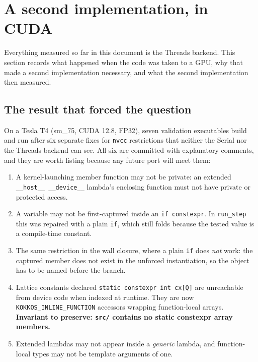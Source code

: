 \documentclass[11pt,a4paper]{article}
\newcommand{\code}[1]{\texttt{\small #1}}
\begin{document}
\section{A second implementation, in CUDA}
\label{sec:cuda}

Everything measured so far in this document is the Threads backend. This section
records what happened when the code was taken to a GPU, why that made a second
implementation necessary, and what the second implementation then measured.

\subsection{The result that forced the question}
\label{sec:cmcollapse}

On a Tesla T4 (sm\_75, CUDA 12.8, FP32), seven validation executables build and
run after six separate fixes for \code{nvcc} restrictions that neither the Serial
nor the Threads backend can see. All six are committed with explanatory comments,
and they are worth listing because any future port will meet them:

\begin{enumerate}[leftmargin=1.4em,itemsep=2pt]
\item A kernel-launching member function may not be private: an extended
  \code{\_\_host\_\_ \_\_device\_\_} lambda's enclosing function must not have
  private or protected access.
\item A variable may not be first-captured inside an \code{if constexpr}. In
  \code{run\_step} this was repaired with a plain \code{if}, which still folds
  because the tested value is a compile-time constant.
\item The same restriction in the wall closure, where a plain \code{if} does
  \emph{not} work: the captured member does not exist in the unforced
  instantiation, so the object has to be named before the branch.
\item Lattice constants declared \code{static constexpr int cx[Q]} are
  unreachable from device code when indexed at runtime. They are now
  \code{KOKKOS\_INLINE\_FUNCTION} accessors wrapping function-local arrays.
  \textbf{Invariant to preserve: \code{src/} contains no static constexpr array
  members.}
\item Extended lambdas may not appear inside a \emph{generic} lambda, and
  function-local types may not be template arguments of one.
\end{enumerate}
\end{document}
